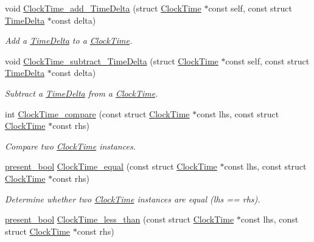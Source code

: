 \begin{DoxyCompactItemize}
void \hyperlink{clock-time_8h_a265e7bf3c63b2986d13dcdc8f43883d4}{\-Clock\-Time\-\_\-add\-\_\-\-Time\-Delta} (struct \hyperlink{structClockTime}{\-Clock\-Time} $\ast$const self, const struct \hyperlink{structTimeDelta}{\-Time\-Delta} $\ast$const delta)
\begin{DoxyCompactList}\small\item\em \-Add a \hyperlink{structTimeDelta}{\-Time\-Delta} to a \hyperlink{structClockTime}{\-Clock\-Time}. \end{DoxyCompactList}\item 
void \hyperlink{clock-time_8h_a9594699dbdbcd56c79928da5e969ba42}{\-Clock\-Time\-\_\-subtract\-\_\-\-Time\-Delta} (struct \hyperlink{structClockTime}{\-Clock\-Time} $\ast$const self, const struct \hyperlink{structTimeDelta}{\-Time\-Delta} $\ast$const delta)
\begin{DoxyCompactList}\small\item\em \-Subtract a \hyperlink{structTimeDelta}{\-Time\-Delta} from a \hyperlink{structClockTime}{\-Clock\-Time}. \end{DoxyCompactList}\item 
int \hyperlink{clock-time_8h_a769989ae3695814b6f64b17ff059d76a}{\-Clock\-Time\-\_\-compare} (const struct \hyperlink{structClockTime}{\-Clock\-Time} $\ast$const lhs, const struct \hyperlink{structClockTime}{\-Clock\-Time} $\ast$const rhs)
\begin{DoxyCompactList}\small\item\em \-Compare two \hyperlink{structClockTime}{\-Clock\-Time} instances. \end{DoxyCompactList}\item 
\hyperlink{types_8h_a1c24e2cdd988b886e889080ded176ae0}{present\-\_\-bool} \hyperlink{clock-time_8h_aface5d0e8bf75acddb72475d76c4b1d8}{\-Clock\-Time\-\_\-equal} (const struct \hyperlink{structClockTime}{\-Clock\-Time} $\ast$const lhs, const struct \hyperlink{structClockTime}{\-Clock\-Time} $\ast$const rhs)
\begin{DoxyCompactList}\small\item\em \-Determine whether two \hyperlink{structClockTime}{\-Clock\-Time} instances are equal (lhs == rhs). \end{DoxyCompactList}\item 
\hyperlink{types_8h_a1c24e2cdd988b886e889080ded176ae0}{present\-\_\-bool} \hyperlink{clock-time_8h_ad0b394066f11e1f695bd10c2aad04ea0}{\-Clock\-Time\-\_\-less\-\_\-than} (const struct \hyperlink{structClockTime}{\-Clock\-Time} $\ast$const lhs, const struct \hyperlink{structClockTime}{\-Clock\-Time} $\ast$const rhs)

\end{DoxyCompactItemize}
